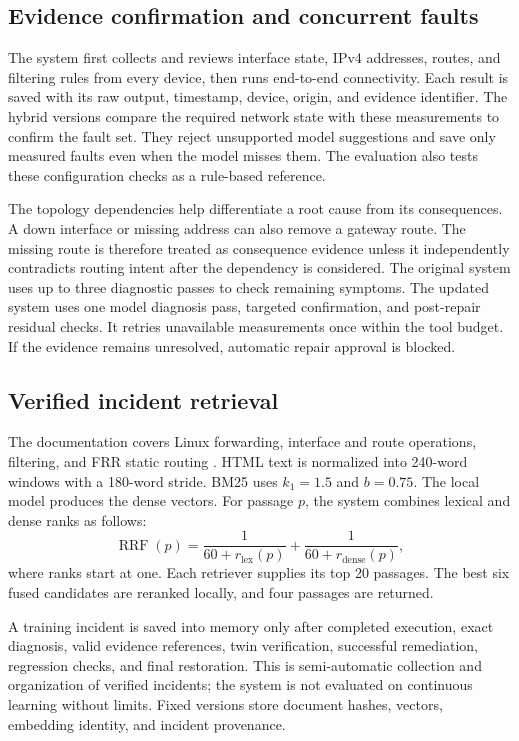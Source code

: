 \documentclass[pdflatex,sn-mathphys-num,iicol]{sn-jnl}
\newcommand{\code}[1]{\texttt{\detokenize{#1}}}
\begin{document}
\subsection{Evidence confirmation and concurrent faults}
The system first collects and reviews interface state, IPv4 addresses, routes, and filtering rules from every device, then runs end-to-end connectivity. Each result is saved with its raw output, timestamp, device, origin, and evidence identifier. The hybrid versions compare the required network state with these measurements to confirm the fault set. They reject unsupported model suggestions and save only measured faults even when the model misses them. The evaluation also tests these configuration checks as a rule-based reference.

The topology dependencies help differentiate a root cause from its consequences. A down interface or missing address can also remove a gateway route. The missing route is therefore treated as consequence evidence unless it independently contradicts routing intent after the dependency is considered. The original system uses up to three diagnostic passes to check remaining symptoms. The updated system uses one model diagnosis pass, targeted confirmation, and post-repair residual checks. It retries unavailable measurements once within the tool budget. If the evidence remains unresolved, automatic repair approval is blocked.

\subsection{Verified incident retrieval}
The documentation covers Linux forwarding, interface and route operations, filtering, and FRR static routing \cite{kernel,iproute,iptables}. HTML text is normalized into 240-word windows with a 180-word stride. BM25 uses $k_1=1.5$ and $b=0.75$. The local \code{all-minilm:latest} model produces the dense vectors. For passage $p$, the system combines lexical and dense ranks as follows:
\begin{equation}
\operatorname{RRF}(p)=\frac{1}{60+r_{\mathrm{lex}}(p)}+
\frac{1}{60+r_{\mathrm{dense}}(p)},\label{eq:rrf}
\end{equation}
where ranks start at one. Each retriever supplies its top 20 passages. The best six fused candidates are reranked locally, and four passages are returned.

A training incident is saved into memory only after completed execution, exact diagnosis, valid evidence references, twin verification, successful remediation, regression checks, and final restoration. This is semi-automatic collection and organization of verified incidents; the system is not evaluated on continuous learning without limits. Fixed versions store document hashes, vectors, embedding identity, and incident provenance.
\end{document}

